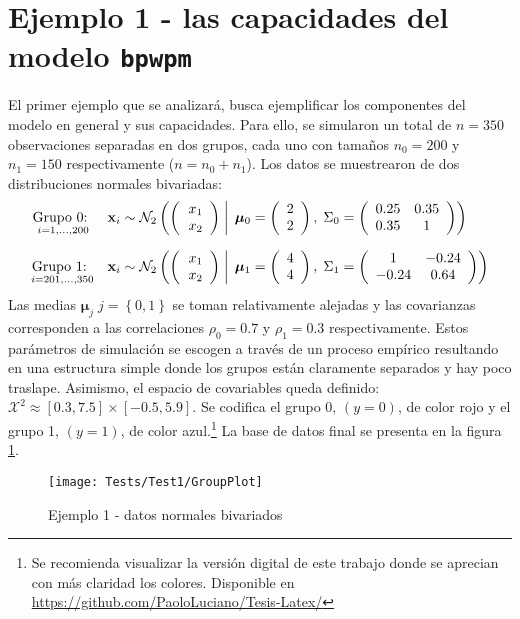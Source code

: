 \documentclass[../Main/Main.tex]{subfiles}
\begin{document}
\section{Ejemplo 1 - las capacidades del modelo \texttt{bpwpm} } \label{sec:T1}
El primer ejemplo que se analizará, busca ejemplificar los componentes del modelo en general y sus capacidades. Para ello, se simularon un total de $n = 350$ observaciones separadas en dos grupos, cada uno con tamaños $n_{0} = 200$ y  $n_{1} = 150$ respectivamente ($n = n_0 + n_1$). Los datos se muestrearon de dos distribuciones normales bivariadas:
\begin{align*}
\underset{i = 1,\ldots,200}{\text{Grupo 0: }} \quad 
&\xsn_i \sim \normbivar{2}{2}{0.25}{0.35}{1}{0} \\[6pt]
\underset{i = 201,\ldots,350}{\text{Grupo 1: }} \quad 
&\xsn_i \sim \normbivar{4}{4}{1}{-0.24}{0.64}{1} 
\end{align*}
Las medias $\bm{\mu}_j \; j = \left\{0,1\right\}$ se toman relativamente alejadas y las covarianzas corresponden a las correlaciones $\rho_0 = 0.7$ y $\rho_1 = 0.3$ respectivamente. Estos parámetros de simulación se escogen a través de un proceso empírico resultando en una estructura simple donde los grupos están claramente separados y hay poco traslape. Asimismo, el espacio de covariables queda definido: $\mathcal{X}^2 \approx [0.3,7.5]\times[-0.5,5.9]$. Se codifica el grupo 0, $(y = 0)$, de color rojo y el grupo 1, $(y = 1)$, de color azul.\footnote{Se recomienda visualizar la versión digital de este trabajo donde se aprecian con más claridad los colores. Disponible en \url{https://github.com/PaoloLuciano/Tesis-Latex/}} La base de datos final se presenta en la figura \ref{fig:Test1Plot}.
\begin{figure}[h]
  \centering
      \texttt{[image: Tests/Test1/GroupPlot]}
  \caption{Ejemplo 1 - datos normales bivariados}
 \label{fig:Test1Plot}
\end{figure}
\end{document}
